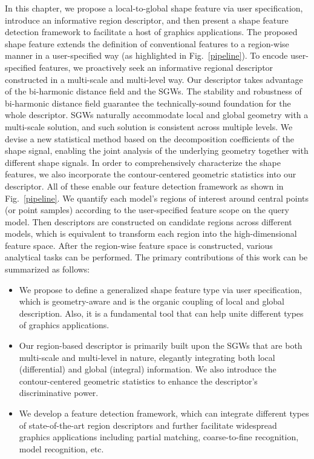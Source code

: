 In this chapter, we propose a local-to-global shape feature via user
specification, introduce an informative region descriptor, and then
present a shape feature detection framework to facilitate a host of
graphics applications. The proposed shape feature extends the
definition of conventional features to a region-wise manner in a
user-specified way (as highlighted in Fig.~\ref{pipeline}). To encode
user-specified features, we proactively seek an informative regional
descriptor constructed in a multi-scale and multi-level way. Our
descriptor takes advantage of the bi-harmonic distance field and the
SGWs. The stability and robustness of bi-harmonic distance field
guarantee the technically-sound foundation for the whole descriptor.
SGWs naturally accommodate local and global geometry with a
multi-scale solution, and such solution is consistent across multiple
levels. We devise a new statistical method based on the decomposition
coefficients of the shape signal, enabling the joint analysis of the
underlying geometry together with different shape signals. In order
to comprehensively characterize the shape features, we also
incorporate the contour-centered geometric statistics into our
descriptor. All of these enable our feature detection framework as
shown in Fig.~\ref{pipeline}. We quantify each model's regions of
interest around central points (or point samples) according to the
user-specified feature scope on the query model. Then descriptors are
constructed on candidate regions across different models, which is
equivalent to transform each region into the high-dimensional feature
space. After the region-wise feature space is constructed, various
analytical tasks can be performed. The primary contributions of this
work can be summarized as follows:

\begin{itemize}
\item We propose to define a generalized shape feature type via user
    specification, which is geometry-aware and is the organic coupling
    of local and global description. Also, it is a fundamental tool
    that can help unite different types of graphics applications.

\item Our region-based descriptor is primarily built upon the SGWs
    that are both multi-scale and multi-level in nature, elegantly
    integrating both local (differential) and global (integral)
    information. We also introduce the contour-centered geometric
    statistics to enhance the descriptor's discriminative power.

\item We develop a feature detection framework, which can integrate
    different types of state-of-the-art region descriptors and further
    facilitate widespread graphics applications including partial
    matching, coarse-to-fine recognition, model recognition, etc.

\end{itemize}

